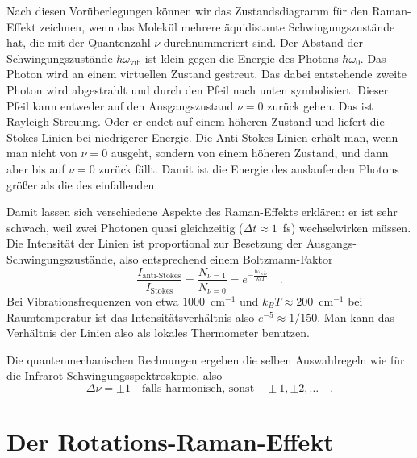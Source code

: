Nach diesen Vorüberlegungen können wir das Zustandsdiagramm für den Raman-Effekt zeichnen, wenn das Molekül mehrere äquidistante Schwingungszustände hat, die mit der Quantenzahl $\nu$ durchnummeriert sind. Der Abstand der Schwingungszustände $\hbar \omega_\text{vib}$ ist klein gegen die Energie des Photons $\hbar \omega_0$. Das Photon wird an einem virtuellen Zustand gestreut. Das dabei entstehende zweite Photon wird abgestrahlt und durch den Pfeil nach unten symbolisiert. Dieser Pfeil kann entweder auf den Ausgangszustand $\nu = 0$ zurück gehen. Das ist Rayleigh-Streuung. Oder er endet auf einem höheren Zustand und liefert die Stokes-Linien bei niedrigerer Energie. Die Anti-Stokes-Linien erhält man, wenn man nicht von $\nu = 0$ ausgeht, sondern von einem höheren Zustand, und dann aber bis auf $\nu = 0$ zurück fällt. Damit ist die Energie des auslaufenden Photons größer als die des einfallenden.



Damit lassen sich verschiedene Aspekte des Raman-Effekts erklären: er ist sehr schwach, weil zwei Photonen quasi gleichzeitig ($\Delta t \approx 1$~fs) wechselwirken müssen. Die Intensität der Linien ist proportional zur Besetzung der Ausgangs-Schwingungszustände, also entsprechend einem Boltzmann-Faktor
\begin{equation}
\frac{I_\text{anti-Stokes}}{I_\text{Stokes}} = 
\frac{N_{\nu = 1}}{N_{\nu = 0}} =
 e^{- \frac{\hbar \omega_\text{vib}}{k_b T}} \quad .
\end{equation}
Bei Vibrationsfrequenzen von etwa $1000$~cm$^{-1}$ und $k_B T \approx 200 $~cm$^{-1}$ bei Raumtemperatur ist das Intensitätsverhältnis also $e^{-5} \approx 1 /150$. Man kann das Verhältnis der Linien also als lokales Thermometer benutzen.

Die quantenmechanischen Rechnungen ergeben die selben Auswahlregeln wie für die Infrarot-Schwingungsspektroskopie, also 
\begin{equation}
 \Delta \nu = \pm 1 \quad \text{falls harmonisch, sonst} \quad \pm 1, \pm 2, \dots   \quad .
\end{equation}



\section{Der Rotations-Raman-Effekt}

